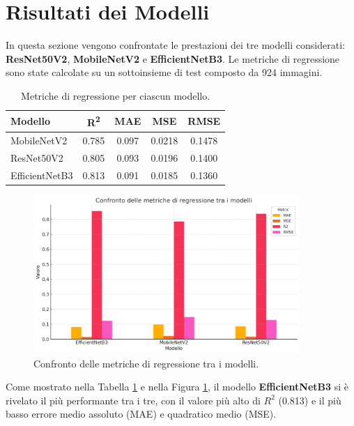 \section{Risultati dei Modelli}
\label{sec:risultati_regressione}

In questa sezione vengono confrontate le prestazioni dei tre modelli considerati: \textbf{ResNet50V2}, \textbf{MobileNetV2} e \textbf{EfficientNetB3}. Le metriche di regressione sono state calcolate su un sottoinsieme di test composto da 924 immagini.

\begin{table}[H]
    \centering
    \caption{Metriche di regressione per ciascun modello.}
    \label{tab:metriche_regressione}
    \begin{tabular}{lcccc}
        \toprule
        \textbf{Modello} & \textbf{R\textsuperscript{2}} & \textbf{MAE} & \textbf{MSE} & \textbf{RMSE} \\
        \midrule
        MobileNetV2     & 0.785 & 0.097 & 0.0218 & 0.1478 \\
        ResNet50V2      & 0.805 & 0.093 & 0.0196 & 0.1400 \\
        EfficientNetB3  & 0.813 & 0.091 & 0.0185 & 0.1360 \\
        \bottomrule
    \end{tabular}
\end{table}

\begin{figure}[H]
    \centering
    \includegraphics[width=0.9\textwidth]{imgs/regression_metrics_comparison.png}
    \caption{Confronto delle metriche di regressione tra i modelli.}
    \label{fig:metrics_comparison}
\end{figure}

Come mostrato nella Tabella \ref{tab:metriche_regressione} e nella Figura \ref{fig:metrics_comparison}, il modello \textbf{EfficientNetB3} si è rivelato il più performante tra i tre, con il valore più alto di $R^2$ (0.813) e il più basso errore medio assoluto (MAE) e quadratico medio (MSE). 

